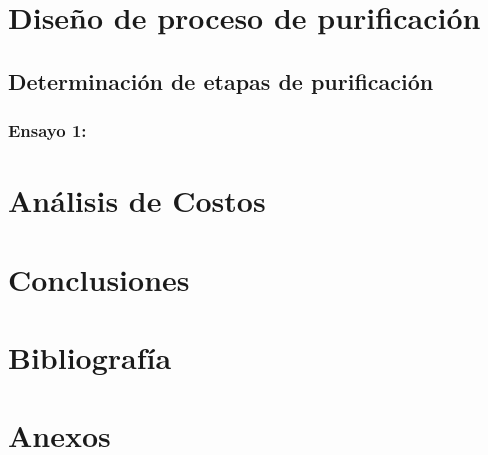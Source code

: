\documentclass[11pt,a4paper]{article}
\begin{document}
\section{Diseño de proceso de purificación}
\subsection{Determinación de etapas de purificación}
\subsubsection{Ensayo 1:}

\section{Análisis de Costos}

\section{Conclusiones}
\pagebreak
\section{Bibliografía}
\printbibliography
\section{Anexos}
\end{document}
